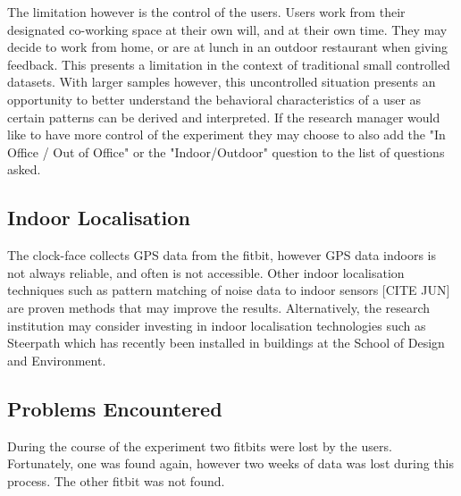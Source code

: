 The limitation however is the control of the users. Users work from their designated co-working space at their own will, and at their own time. They may decide to work from home, or are at lunch in an outdoor restaurant when giving feedback. This presents a limitation in the context of traditional small controlled datasets. With larger samples however, this uncontrolled situation presents an opportunity to better understand the behavioral characteristics of a user as certain patterns can be derived and interpreted. If the research manager would like to have more control of the experiment they may choose to also add the "In Office / Out of Office" or the "Indoor/Outdoor" question to the list of questions asked.







\subsection{Indoor Localisation}

The clock-face collects GPS data from the fitbit, however GPS data indoors is not always reliable, and often is not accessible. Other indoor localisation techniques such as pattern matching of noise data to indoor sensors [CITE JUN] are proven methods that may improve the results. Alternatively, the research institution may consider investing in indoor localisation technologies such as Steerpath which has recently been installed in buildings at the School of Design and Environment. 



\subsection{Problems Encountered}

During the course of the experiment two fitbits were lost by the users. Fortunately, one was found again, however two weeks of data was lost during this process. The other fitbit was not found. 





